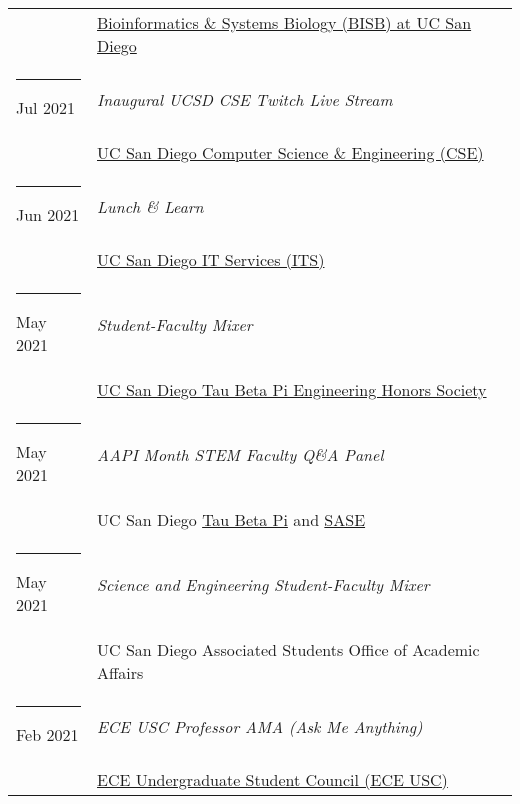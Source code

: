 \documentclass[margin,line]{res}
\begin{document}
\begin{resume}
\begin{longtable}{@{}p{0.7in}p{4in}}
\hspace*{-4mm} & \hspace{4mm} \href{https://bioinformatics.ucsd.edu/}{Bioinformatics \& Systems Biology (BISB) at UC San Diego}\\
\hspace*{-4mm} \rule{-1mm}{5mm} Jul 2021 & \textit{Inaugural UCSD CSE Twitch Live Stream}\\*
\hspace*{-4mm} & \hspace{4mm} \href{https://cse.ucsd.edu/}{UC San Diego Computer Science \& Engineering (CSE)}\\
\hspace*{-4mm} \rule{-1mm}{5mm} Jun 2021 & \textit{Lunch \& Learn}\\*
\hspace*{-4mm} & \hspace{4mm} \href{https://its.ucsd.edu}{UC San Diego IT Services (ITS)}\\
\hspace*{-4mm} \rule{-1mm}{5mm} May 2021 & \textit{Student-Faculty Mixer}\\*
\hspace*{-4mm} & \hspace{4mm} \href{https://tbp.ucsd.edu/home}{UC San Diego Tau Beta Pi Engineering Honors Society}\\
\hspace*{-4mm} \rule{-1mm}{5mm} May 2021 & \textit{AAPI Month STEM Faculty Q\&A Panel}\\*
\hspace*{-4mm} & \hspace{4mm} UC San Diego \href{https://tbp.ucsd.edu/home}{Tau Beta Pi} and \href{https://saseatucsd.weebly.com/}{SASE}\\
\hspace*{-4mm} \rule{-1mm}{5mm} May 2021 & \textit{Science and Engineering Student-Faculty Mixer}\\*
\hspace*{-4mm} & \hspace{4mm} UC San Diego Associated Students Office of Academic Affairs\\
\hspace*{-4mm} \rule{-1mm}{5mm} Feb 2021 & \textit{ECE USC Professor AMA (Ask Me Anything)}\\*
\hspace*{-4mm} & \hspace{4mm} \href{https://eceusc.ucsd.edu/}{ECE Undergraduate Student Council (ECE USC)}\\

\end{longtable}
\end{resume}
\end{document}

